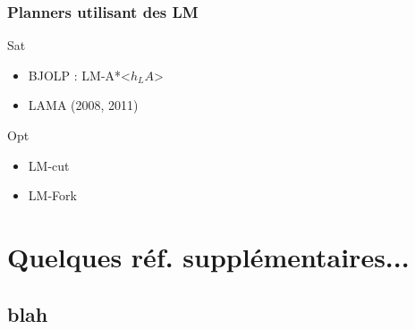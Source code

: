 \begin{frame}
  \frametitle{Planners utilisant des LM}
  \begin{block}{Sat}
    \begin{itemize}
      \item BJOLP : LM-A*<$h_LA$>
      \item LAMA (2008, 2011)
    \end{itemize}
  \end{block}

  \begin{block}{Opt}
    \begin{itemize}
      \item LM-cut
      \item LM-Fork
    \end{itemize}
  \end{block}
\end{frame}

\section{Quelques réf. supplémentaires...}
  \subsection*{blah}
\begin{frame}
  \begin{block}{}
      
  \end{block}
\end{frame}

